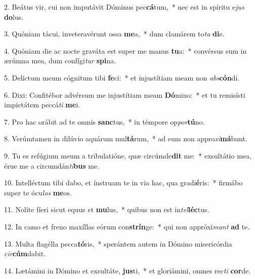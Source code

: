 2. Beátus vir, cui non imputávit Dóminus pec\textbf{cá}tum,~*  nec est in spíritu e\textit{jus} \textbf{do}lus.\

3. Quóniam tácui, inveteravérunt ossa \textbf{me}a,~*  dum clamárem to\textit{ta} \textbf{di}e.\

4. Quóniam die ac nocte graváta est super me manus \textbf{tu}a:~*  convérsus sum in ærúmna mea, dum confígi\textit{tur} \textbf{spi}na.\

5. Delíctum meum cógnitum tibi \textbf{fe}ci:~*  et injustítiam meam non \textit{abs}\textbf{cón}di.\

6. Dixi: Confitébor advérsum me injustítiam meam \textbf{Dó}mino:~*  et tu remisísti impietátem peccá\textit{ti} \textbf{me}i.\

7. Pro hac orábit ad te omnis \textbf{sanc}tus,~*  in témpore op\textit{por}\textbf{tú}no.\

8. Verúmtamen in dilúvio aquárum mul\textbf{tá}rum,~*  ad eum non appro\textit{xi}\textbf{má}bunt.\

9. Tu es refúgium meum a tribulatióne, quæ circúmde\textbf{dit} me:~*  exsultátio mea, érue me a circumdán\textit{ti}\textbf{bus} me.\

10. Intelléctum tibi dabo, et ínstruam te in via hac, qua gradi\textbf{é}ris:~*  firmábo super te ócu\textit{los} \textbf{me}os.\

11. Nolíte fíeri sicut equus et \textbf{mu}lus,~*  quibus non est in\textit{tel}\textbf{léc}tus.\

12. In camo et freno maxíllas eórum con\textbf{strín}ge:~*  qui non appróxi\textit{mant} \textbf{ad} te.\

13. Multa flagélla pecca\textbf{tó}ris,~*  sperántem autem in Dómino misericórdia \textit{cir}\textbf{cúm}dabit.\

14. Lætámini in Dómino et exsultáte, \textbf{jus}ti,~*  et gloriámini, omnes rec\textit{ti} \textbf{cor}de.\

